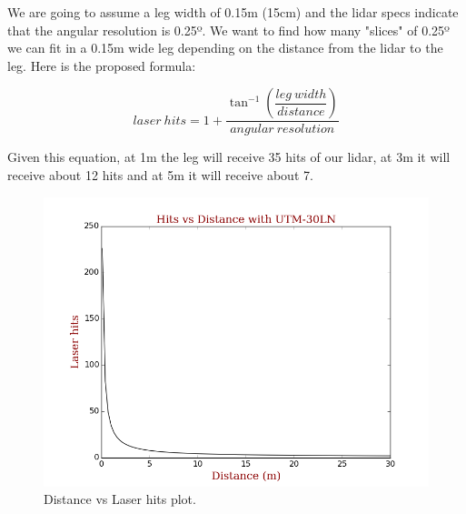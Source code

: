 \documentclass[a4paper]{article}
\begin{document}
\begin{enumerate}[label=\alph*.]
We are going to assume a leg width of 0.15m (15cm) and the lidar specs indicate that the angular resolution is 0.25º. We want to find how many "slices" of 0.25º we can fit in a 0.15m wide leg depending on the distance from the lidar to the leg.
Here is the proposed formula:

\begin{equation}
{laser\ hits} = 1+\dfrac{\tan^{-1}(\dfrac{leg\ width}{distance})}{angular\ resolution}
\end{equation}

Given this equation, at 1m the leg will receive 35 hits of our lidar, at 3m it will receive about 12 hits and at 5m it will receive about 7.

\begin{figure}[ht]
  \centering
  \includegraphics[scale=0.5]{Exercise_1_2_c}
  \caption{Distance vs Laser hits plot.}
  \label{fig:distance_laser_plot}
\end{figure}
\end{enumerate}
\end{document}
